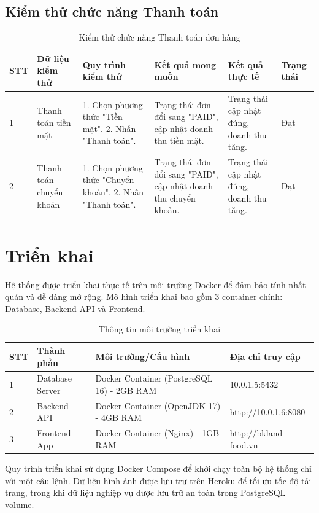\subsection{Kiểm thử chức năng Thanh toán}

\begin{table}[H]
    \centering
    \caption{Kiểm thử chức năng Thanh toán đơn hàng}
    \label{tab:test_payment}
    \begin{tabular}{|p{0.5cm}|p{3.5cm}|p{4cm}|p{2.5cm}|p{2cm}|p{1.5cm}|}
        \hline
        \textbf{STT} & \textbf{Dữ liệu kiểm thử} & \textbf{Quy trình kiểm thử} & \textbf{Kết quả mong muốn} & \textbf{Kết quả thực tế} & \textbf{Trạng thái} \\
        \hline
        1 & Thanh toán tiền mặt & 1. Chọn phương thức "Tiền mặt". 2. Nhấn "Thanh toán". & Trạng thái đơn đổi sang "PAID", cập nhật doanh thu tiền mặt. & Trạng thái cập nhật đúng, doanh thu tăng. & Đạt \\
        \hline
        2 & Thanh toán chuyển khoản & 1. Chọn phương thức "Chuyển khoản". 2. Nhấn "Thanh toán". & Trạng thái đơn đổi sang "PAID", cập nhật doanh thu chuyển khoản. & Trạng thái cập nhật đúng, doanh thu tăng. & Đạt \\
        \hline
    \end{tabular}
\end{table}

\section{Triển khai}

Hệ thống được triển khai thực tế trên môi trường Docker để đảm bảo tính nhất quán và dễ dàng mở rộng. Mô hình triển khai bao gồm 3 container chính: Database, Backend API và Frontend.

\begin{table}[H]
    \centering
    \caption{Thông tin môi trường triển khai}
    \label{tab:deployment_info}
    \begin{tabular}{|p{1cm}|p{3cm}|p{5cm}|p{4cm}|}
        \hline
        \textbf{STT} & \textbf{Thành phần} & \textbf{Môi trường/Cấu hình} & \textbf{Địa chỉ truy cập} \\
        \hline
        1 & Database Server & Docker Container (PostgreSQL 16) - 2GB RAM & 10.0.1.5:5432 \\
        \hline
        2 & Backend API & Docker Container (OpenJDK 17) - 4GB RAM & http://10.0.1.6:8080 \\
        \hline
        3 & Frontend App & Docker Container (Nginx) - 1GB RAM & http://bkland-food.vn \\
        \hline
    \end{tabular}
\end{table}

Quy trình triển khai sử dụng Docker Compose để khởi chạy toàn bộ hệ thống chỉ với một câu lệnh. Dữ liệu hình ảnh được lưu trữ trên Heroku để tối ưu tốc độ tải trang, trong khi dữ liệu nghiệp vụ được lưu trữ an toàn trong PostgreSQL volume.


